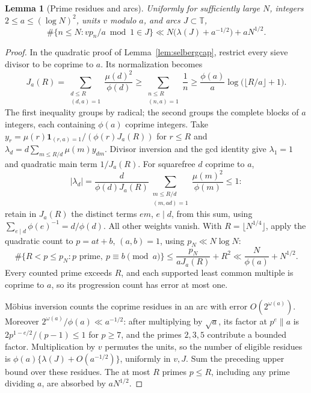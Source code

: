 \documentclass[11pt,a4paper]{article}
\newtheorem{lemma}[theorem]{Lemma}
\begin{document}
\begin{lemma}[Prime residues and arcs]\label{lem:clockarcs}
Uniformly for sufficiently large $N$, integers
$2\le a\le(\log N)^2$, units $v$ modulo $a$, and arcs $J\subset\mathbb T$,
\[
 \#\{n\le N:vp_n/a\bmod1\in J\}
 \ll N\bigl(\lambda(J)+a^{-1/2}\bigr)+aN^{1/2}.
\]
\end{lemma}
\begin{proof}
In the quadratic proof of Lemma~\ref{lem:selbergcap}, restrict every
sieve divisor to be coprime to $a$. Its normalization becomes
\[
 J_a(R)=\sum_{\substack{d\le R\\(d,a)=1}}\frac{\mu(d)^2}{\phi(d)}
 \ge\sum_{\substack{n\le R\\(n,a)=1}}\frac1n
 \ge\frac{\phi(a)}a\log\bigl(\lfloor R/a\rfloor+1\bigr).
\]
The first inequality groups by radical; the second groups the complete
blocks of $a$ integers, each containing $\phi(a)$ coprime integers.
Take $y_r=\mu(r)\mathbf1_{(r,a)=1}/(\phi(r)J_a(R))$ for $r\le R$
and $\lambda_d=d\sum_{m\le R/d}\mu(m)y_{dm}$.
Divisor inversion and the gcd identity give $\lambda_1=1$ and quadratic
main term $1/J_a(R)$.
For squarefree $d$ coprime to $a$,
\[
 |\lambda_d|=\frac{d}{\phi(d)J_a(R)}
 \sum_{\substack{m\le R/d\\(m,ad)=1}}\frac{\mu(m)^2}{\phi(m)}\le1:
\]
retain in $J_a(R)$ the distinct terms $em$, $e\mid d$, from this sum,
using $\sum_{e\mid d}\phi(e)^{-1}=d/\phi(d)$.
All other weights vanish. With $R=\lfloor N^{1/4}\rfloor$, apply the
quadratic count to $p=at+b$, $(a,b)=1$, using $p_N\ll N\log N$:
\[
 \#\{R<p\le p_N:p\text{ prime},\ p\equiv b\pmod a\}
 \le\frac{p_N}{aJ_a(R)}+R^2
 \ll\frac{N}{\phi(a)}+N^{1/2}.
\]
Every counted prime exceeds $R$, and each supported least common
multiple is coprime to $a$, so its progression count has error at most one.

M\"obius inversion counts the coprime residues in an arc with error
$O(2^{\omega(a)})$. Moreover
$2^{\omega(a)}/\phi(a)\ll a^{-1/2}$: after multiplying by $\sqrt a$,
its factor at $p^e\parallel a$ is
$2p^{1-e/2}/(p-1)\le1$ for $p\ge7$, and the primes $2,3,5$ contribute
a bounded factor. Multiplication by $v$ permutes the units, so the
number of eligible residues is
$\phi(a)\{\lambda(J)+O(a^{-1/2})\}$, uniformly in $v,J$.
Sum the preceding upper bound over these residues. The at most $R$
primes $p\le R$, including any prime dividing $a$, are absorbed by
$aN^{1/2}$.
\end{proof}
\end{document}
